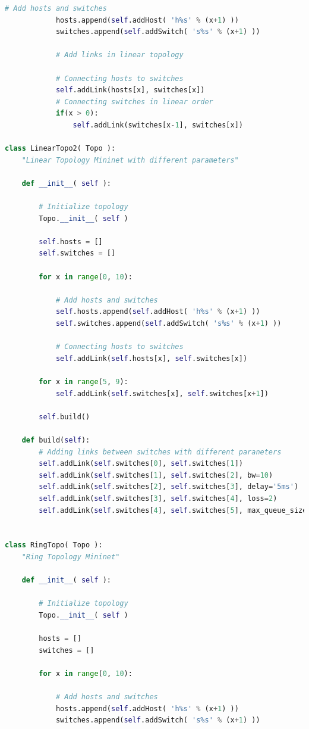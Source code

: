 \documentclass[a4paper, 11pt]{article}
\begin{document}
\begin{appendices}
\begin{lstlisting}[language=python]
            # Add hosts and switches
            hosts.append(self.addHost( 'h%s' % (x+1) ))
            switches.append(self.addSwitch( 's%s' % (x+1) ))

            # Add links in linear topology

            # Connecting hosts to switches
            self.addLink(hosts[x], switches[x])
            # Connecting switches in linear order
            if(x > 0):
                self.addLink(switches[x-1], switches[x])

class LinearTopo2( Topo ):
    "Linear Topology Mininet with different parameters"

    def __init__( self ):

        # Initialize topology
        Topo.__init__( self )

        self.hosts = []
        self.switches = []

        for x in range(0, 10):

            # Add hosts and switches
            self.hosts.append(self.addHost( 'h%s' % (x+1) ))
            self.switches.append(self.addSwitch( 's%s' % (x+1) ))

            # Connecting hosts to switches
            self.addLink(self.hosts[x], self.switches[x])
        
        for x in range(5, 9):
            self.addLink(self.switches[x], self.switches[x+1])

        self.build()

    def build(self):
        # Adding links between switches with different paraneters
        self.addLink(self.switches[0], self.switches[1])
        self.addLink(self.switches[1], self.switches[2], bw=10)
        self.addLink(self.switches[2], self.switches[3], delay='5ms')
        self.addLink(self.switches[3], self.switches[4], loss=2)
        self.addLink(self.switches[4], self.switches[5], max_queue_size=2)


class RingTopo( Topo ):
    "Ring Topology Mininet"

    def __init__( self ):

        # Initialize topology
        Topo.__init__( self )

        hosts = []
        switches = []

        for x in range(0, 10):

            # Add hosts and switches
            hosts.append(self.addHost( 'h%s' % (x+1) ))
            switches.append(self.addSwitch( 's%s' % (x+1) ))


\end{lstlisting}
\end{appendices}
\end{document}
